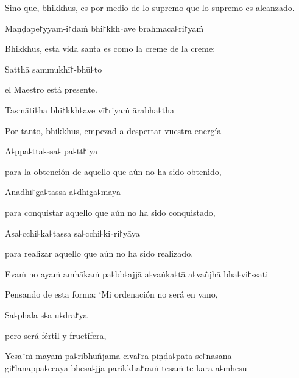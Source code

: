 \begin{english}
	Sino que, bhikkhus, es por medio de lo supremo que lo supremo es alcanzado.
\end{english}

Maṇḍape꜓yyam-i꜓daṁ bhi꜓kkh꜕ave brahmaca꜕ri꜓yaṁ

\begin{english}
	Bhikkhus, esta vida santa es como la creme de la creme:
\end{english}

Satthā sammukhī꜓-bhū꜕to

\begin{english}
	el Maestro está presente.
\end{english}

Tasmāti꜕ha bhi꜓kkh꜕ave vī꜓riyaṁ ārabha꜕tha

\begin{english}
	Por tanto, bhikkhus, empezad a despertar vuestra energía
\end{english}

A꜕ppa꜕tta꜕ssa꜕ pa꜕tt꜓iyā

\begin{english}
	para la obtención de aquello que aún no ha sido obtenido,
\end{english}

\ifaivedition
\clearpage
\fi

Anadhi꜓ga꜕tassa a꜕dhiga꜕māya

\begin{english}
	para conquistar aquello que aún no ha sido conquistado,
\end{english}

Asa꜕cchi꜕ka꜕tassa sa꜕cchi꜕ki꜕ri꜓yāya

\begin{english}
	para realizar aquello que aún no ha sido realizado.
\end{english}

Evaṁ no ayaṁ amhākaṁ pa꜕bb꜕ajjā a꜕vaṅka꜕tā a꜕vañjhā bha꜕vi꜓ssati

\begin{english}
	Pensando de esta forma: ‘Mi ordenación no será en vano,
\end{english}

Sa꜕phalā s꜕a-u꜕dra꜓yā

\begin{english}
	pero será fértil y fructífera,
\end{english}

Yesa꜓ṁ mayaṁ pa꜕ribhuñjāma cīva꜓ra-piṇḍa꜕pāta-se꜓nāsana-\\
gi꜓lānappa꜕ccaya-bhesa꜕jja-parikkhā꜓raṁ tesaṁ te kārā a꜕mhesu

